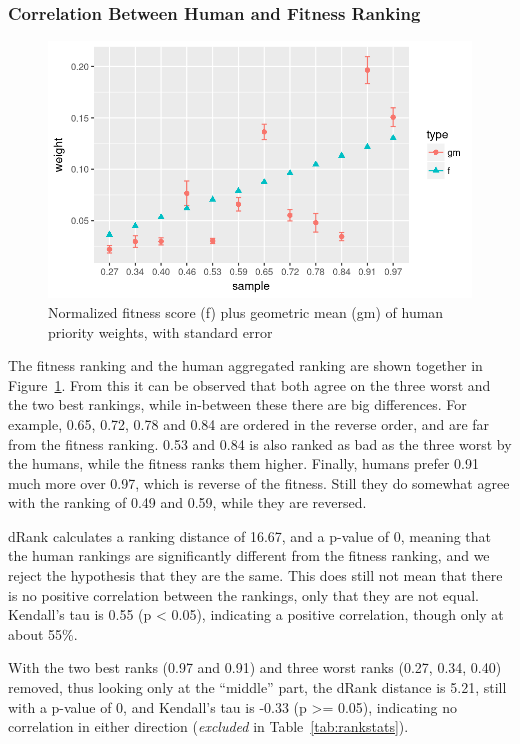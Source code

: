 \subsubsection{Correlation Between Human and Fitness Ranking}
\begin{figure}
    \centering
    \includegraphics[width=1.0\textwidth]{figures/weights}
    \caption[Fitness score plus geometric mean and arithmetic mean of priority weights]{Normalized fitness score (f) plus geometric mean (gm) of human priority weights, with standard error}
    \label{fig:weights}
\end{figure}

The fitness ranking and the human aggregated ranking are shown together in Figure~\ref{fig:weights}.
From this it can be observed that both agree on the three worst and the two best rankings, while in-between these there are big differences.
For example, 0.65, 0.72, 0.78 and 0.84 are ordered in the reverse order, and are far from the fitness ranking.
0.53 and 0.84 is also ranked as bad as the three worst by the humans, while the fitness ranks them higher.
Finally, humans prefer 0.91 much more over 0.97, which is reverse of the fitness.
Still they do somewhat agree with the ranking of 0.49 and 0.59, while they are reversed.

dRank calculates a ranking distance of 16.67, and a p-value of 0, meaning that the human rankings are significantly different from the fitness ranking, and we reject the hypothesis that they are the same.
This does still not mean that there is no positive correlation between the rankings, only that they are not equal.
Kendall's tau is 0.55 (p < 0.05), indicating a positive correlation, though only at about 55\%.

With the two best ranks (0.97 and 0.91) and three worst ranks (0.27, 0.34, 0.40) removed, thus looking only at the ``middle'' part, the dRank distance is 5.21, still with a p-value of 0, and Kendall's tau is -0.33 (p >= 0.05), indicating no correlation in either direction (\textit{excluded} in Table~\ref{tab:rankstats}).

